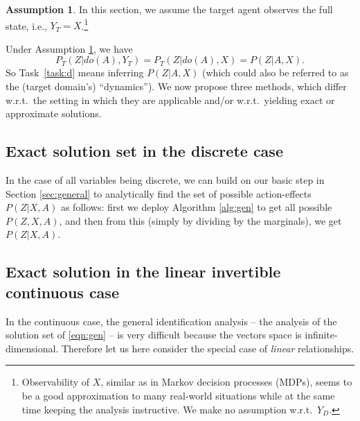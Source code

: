 \documentclass[letterpaper]{article} %
\theoremstyle{definition}%
\theoremstyle{definition}
\newtheorem{assumption}{Assumption} %
\newcommand{\dob}[1]{do(#1)}
\newcommand{\Out}{Z}
\newcommand{\todo}[1]{\textcolor{red}{#1}}
\begin{document}
\begin{assumption}
	\label{asm:d}
	In this section, we assume the target agent observes the full state, i.e., $Y_T{=}X$.\footnote{Observability of $X$, similar as in Markov decision processes (MDPs), seems to be a good approximation to many real-world situations while at the same time keeping the analysis instructive. We make no assumption w.r.t.\ $Y_D$.}
\end{assumption}

Under Assumption \ref{asm:d}, we have 
$$
P_T(\Out|\dob{A}, Y_T) = P_T(\Out|\dob{A}, X) = P(\Out|A, X).
$$
 So Task~\ref{task:d} means inferring $P(\Out|A, X)$  (which could also be referred to as the (target domain's) ``dynamics'').
We now propose three methods, which differ w.r.t.\ the setting in which they are applicable and/or w.r.t.\ yielding exact or approximate solutions.





\subsection{Exact solution set in the discrete case}
\label{sec:deex}

In the case of all variables being discrete, we can build on our basic step in Section \ref{sec:general} to analytically find the set of possible action-effects $P(\Out|X, A)$ as follows: first we deploy Algorithm \ref{alg:gen} to get all possible $P(\Out,X, A)$, and then from this (simply by dividing by the marginals), we get  $P(\Out|X, A)$.




\subsection{Exact solution in the linear invertible continuous case}
\label{sec:deexlin}


In the continuous case, the general identification analysis -- the analysis of the solution set of \eqref{eqn:gen} -- is very difficult because the vectors space is infinite-dimensional.
Therefore let us here consider the special case of \emph{linear} relationships.
\end{document}
